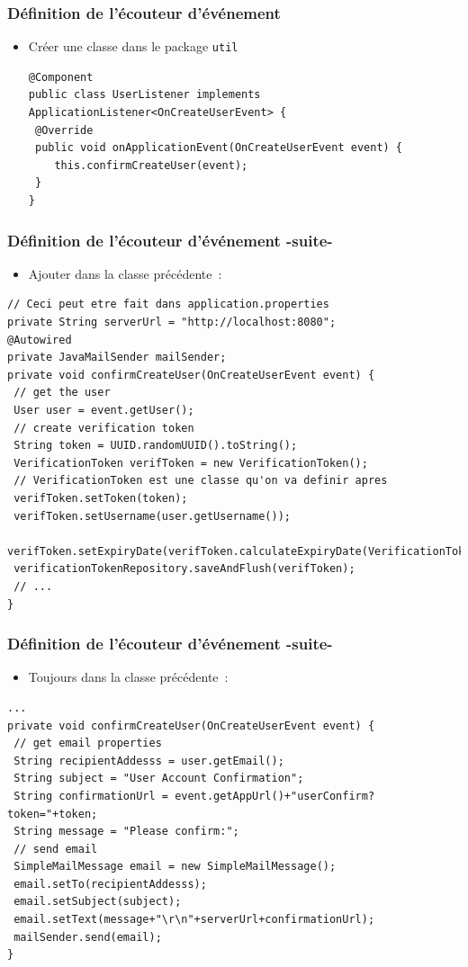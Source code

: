 \documentclass{beamer}
\begin{document}
\begin{frame}[fragile]
	\frametitle{Définition de l'écouteur d'événement}
	\begin{itemize}
		\item Créer une classe dans le package \texttt{util} 
\begin{lstlisting}
@Component
public class UserListener implements ApplicationListener<OnCreateUserEvent> {
 @Override
 public void onApplicationEvent(OnCreateUserEvent event) {
 	this.confirmCreateUser(event);	
 }
}
\end{lstlisting}
	\end{itemize}
\end{frame}

\begin{frame}[fragile]
	\frametitle{Définition de l'écouteur d'événement -suite-}
	\begin{itemize}
		\item Ajouter dans la classe précédente~:
	\end{itemize}
\begin{lstlisting}
// Ceci peut etre fait dans application.properties
private String serverUrl = "http://localhost:8080";
@Autowired
private JavaMailSender mailSender;
private void confirmCreateUser(OnCreateUserEvent event) {
 // get the user
 User user = event.getUser();
 // create verification token
 String token = UUID.randomUUID().toString();
 VerificationToken verifToken = new VerificationToken();
 // VerificationToken est une classe qu'on va definir apres
 verifToken.setToken(token);
 verifToken.setUsername(user.getUsername());
 verifToken.setExpiryDate(verifToken.calculateExpiryDate(VerificationToken.EXPIRATION));
 verificationTokenRepository.saveAndFlush(verifToken);
 // ...	
}
\end{lstlisting}
	
\end{frame}

\begin{frame}[fragile]
	\frametitle{Définition de l'écouteur d'événement -suite-}
	\begin{itemize}
		\item Toujours dans la classe précédente~:
	\end{itemize}
\begin{lstlisting}
...
private void confirmCreateUser(OnCreateUserEvent event) {
 // get email properties
 String recipientAddesss = user.getEmail();
 String subject = "User Account Confirmation";
 String confirmationUrl = event.getAppUrl()+"userConfirm?token="+token;
 String message = "Please confirm:";
 // send email
 SimpleMailMessage email = new SimpleMailMessage();
 email.setTo(recipientAddesss);
 email.setSubject(subject);
 email.setText(message+"\r\n"+serverUrl+confirmationUrl);
 mailSender.send(email);
}
\end{lstlisting}

\end{frame}
\end{document}
